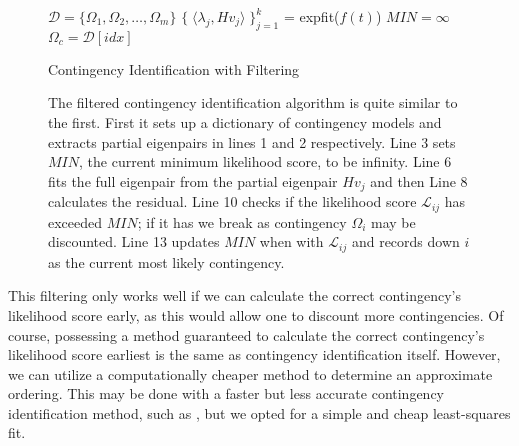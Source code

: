 \begin{figure}

\begin{algorithm}[H]
\SetAlgoLined
{}
 $\mathcal{D} =  \{ \Omega_1, \Omega_2, \dots, \Omega_m \}$ 
 $\{ \; \langle {\lambda_j}, H{v_j} \rangle \; \}_{j = 1}^k$ = expfit($f(t)$) 
 $MIN = \infty$ \;
 $\Omega_c = \mathcal{D}[idx]$ 
 \caption{Contingency Identification with Filtering}
 \label{algorithmfiltering}
\end{algorithm}
\caption{The filtered contingency identification algorithm is quite similar to the first. First it sets up a dictionary of contingency models and extracts partial eigenpairs in lines 1 and 2 respectively. Line 3 sets $MIN$, the current minimum likelihood score, to be infinity. Line 6 fits the full eigenpair from the partial eigenpair $Hv_j$ and then Line 8 calculates the residual. Line 10 checks if the likelihood score $\mathcal{L}_{ij}$ has exceeded $MIN$; if it has we break as contingency $\Omega_i$ may be discounted. Line 13 updates $MIN$ when with $\mathcal{L}_{ij}$ and records down $i$ as the current most likely contingency.}
\end{figure}
This filtering only works well if we can calculate the correct contingency's likelihood score early, as this would allow one to discount more contingencies. Of course, possessing a method guaranteed to calculate the correct contingency's likelihood score earliest is the same as contingency identification itself. However, we can utilize a computationally cheaper method to determine an approximate ordering. This may be done with a faster but less accurate contingency identification method, such as \cite{ponce2016flier}, but we opted for a simple and cheap least-squares fit. 


